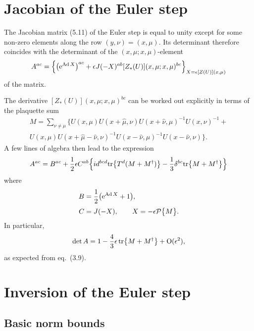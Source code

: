 \section{Jacobian of the Euler step}

The Jacobian matrix (5.11) of the Euler step
is equal to unity except for some non-zero elements
along the row $(y,\nu)=(x,\mu)$. Its determinant
therefore coincides with the determinant of the $(x,\mu;x,\mu)$-element
\begin{equation}
  A^{ac}=\left\{\left(\mathrm{e}^{\mathrm{Ad}\, X}\right)^{ac}
  +\epsilon J(-X)^{ab}[Z_{*}(U)](x,\mu;x,\mu)^{bc}
  \right\}_{X=\epsilon[Z(U)](x,\mu)}
\end{equation}
of the matrix.

The derivative $[Z_{*}(U)](x,\mu;x,\mu)^{bc}$
can be worked out explicitly in terms of
the plaquette sum
\begin{multline}
  M=\sum_{\nu\neq\mu}\bigl\{
  U(x,\mu)U(x+\hat{\mu},\nu)U(x+\hat{\nu},\mu)^{-1}U(x,\nu)^{-1}+\\
  U(x,\mu)U(x+\hat{\mu}-\hat{\nu},\nu)^{-1}U(x-\hat{\nu},\mu)^{-1}
  U(x-\hat{\nu},\nu)\bigr\}.
\end{multline}
A few lines of algebra then lead to the expression
\begin{equation}
  A^{ac}=B^{ac}+\frac{1}{2}\epsilon C^{ab}\Bigl\{
  id^{bcd}\mathrm{tr}\bigl\{T^d(M+M^{\dagger})\bigr\}
  -\frac{1}{3}\delta^{bc}\mathrm{tr}\bigl\{M+M^{\dagger}\bigr\}\Bigl\}
\end{equation}
where
\begin{align}
  B&=\frac{1}{2}\bigl(\mathrm{e}^{\mathrm{Ad}\, X}+1\bigr),
  \\[0.6ex]
  C&=J(-X),\qquad X=-\epsilon\mathcal{P}\bigl\{M\bigr\}.
\end{align}
In particular,
\begin{equation}
  \det A=1-\frac{4}{3}\epsilon\,\mathrm{tr}\bigl\{M+M^{\dagger}\bigr\}+\mathrm{O}(\epsilon^2),
\end{equation}
as expected from eq.~(3.9).

\section{Inversion of the Euler step}

\subsection{Basic norm bounds}

